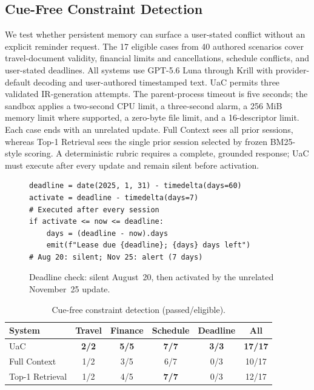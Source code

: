 \documentclass[letterpaper]{article} %
\begin{document}
\subsection{Cue-Free Constraint Detection}
\label{sec:active-service}

We test whether persistent memory can surface a user-stated conflict without an explicit reminder request. The 17 eligible cases from 40 authored scenarios cover travel-document validity, financial limits and cancellations, schedule conflicts, and user-stated deadlines. All systems use GPT-5.6 Luna through Krill with provider-default decoding and user-authored timestamped text. UaC permits three validated IR-generation attempts. The parent-process timeout is five seconds; the sandbox applies a two-second CPU limit, a three-second alarm, a 256 MiB memory limit where supported, a zero-byte file limit, and a 16-descriptor limit. Each case ends with an unrelated update. Full Context sees all prior sessions, whereas Top-1 Retrieval sees the single prior session selected by frozen BM25-style scoring. A deterministic rubric requires a complete, grounded response; UaC must execute after every update and remain silent before activation.

\begin{figure}[t]
\begin{lstlisting}[basicstyle=\small\ttfamily]
deadline = date(2025, 1, 31) - timedelta(days=60)
activate = deadline - timedelta(days=7)
# Executed after every session
if activate <= now <= deadline:
    days = (deadline - now).days
    emit(f"Lease due {deadline}; {days} days left")
# Aug 20: silent; Nov 25: alert (7 days)
\end{lstlisting}
\caption{Deadline check: silent August~20, then activated by the unrelated November~25 update.}
\label{fig:constraint-example}
\end{figure}

\begin{table}[t]
\centering
{%
\footnotesize
\setlength{\tabcolsep}{2.5pt}
\begin{tabular}{@{}lccccc@{}}
\toprule
System & Travel & Finance & Schedule & Deadline & All \\
\midrule
UaC & \textbf{2/2} & \textbf{5/5} & \textbf{7/7} & \textbf{3/3} & \textbf{17/17} \\
Full Context & 1/2 & 3/5 & 6/7 & 0/3 & 10/17 \\
Top-1 Retrieval & 1/2 & 4/5 & \textbf{7/7} & 0/3 & 12/17 \\
\bottomrule
\end{tabular}
}
\caption{Cue-free constraint detection (passed/eligible).}
\label{tab:active-service}
\end{table}
\end{document}
